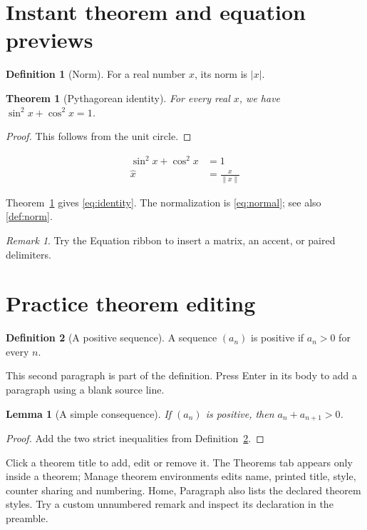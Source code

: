 \documentclass[12pt]{article}
\newtheorem{theorem}{Theorem}[section]
\newtheorem{lemma}[lemma]{Lemma}
\theoremstyle{definition}
\newtheorem{definition}[definition]{Definition}
\theoremstyle{remark}
\newtheorem*{remark}{Remark}
\numberwithin{equation}{section}
\begin{document}
\section{Instant theorem and equation previews}
\begin{definition}[Norm]\label{def:norm}
For a real number $x$, its norm is $\lvert x\rvert$.
\end{definition}

\begin{theorem}[Pythagorean identity]\label{thm:identity}
For every real $x$, we have $\sin^2 x+\cos^2 x=1$.
\end{theorem}

\begin{proof}
This follows from the unit circle.
\end{proof}

\begin{align}
 \sin^2 x+\cos^2 x &= 1 \label{eq:identity}\\
 \hat{x} &= \frac{x}{\lVert x\rVert} \tag{N}\label{eq:normal}
\end{align}

Theorem~\ref{thm:identity} gives \eqref{eq:identity}.
The normalization is \eqref{eq:normal}; see also \autoref{def:norm}.

\begin{remark}
Try the Equation ribbon to insert a matrix, an accent, or paired delimiters.
\end{remark}

\section{Practice theorem editing}
\begin{definition}[A positive sequence]\label{def:positive}
A sequence $(a_n)$ is positive if $a_n>0$ for every $n$.

This second paragraph is part of the definition. Press Enter in its body to
add a paragraph using a blank source line.
\end{definition}

\begin{lemma}[A simple consequence]
If $(a_n)$ is positive, then $a_n+a_{n+1}>0$.
\end{lemma}
\begin{proof}
Add the two strict inequalities from Definition~\ref{def:positive}.
\end{proof}

Click a theorem title to add, edit or remove it. The Theorems tab appears only
inside a theorem; Manage theorem environments edits name, printed title, style,
counter sharing and numbering. Home, Paragraph also lists the declared theorem
styles. Try a custom unnumbered remark and inspect its declaration in the preamble.
\end{document}
